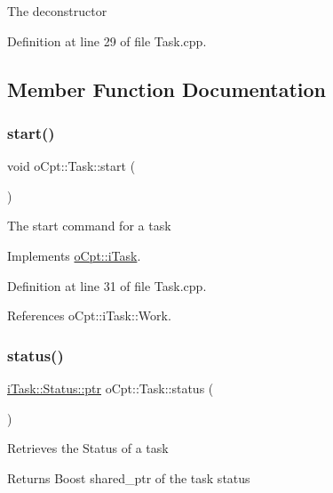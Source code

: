 The deconstructor 

Definition at line 29 of file Task.\+cpp.



\subsection{Member Function Documentation}
\hypertarget{classo_cpt_1_1_task_a8acd8d2125df0aef37eb1ebf0e3e49c8}{}\label{classo_cpt_1_1_task_a8acd8d2125df0aef37eb1ebf0e3e49c8} 
\subsubsection{\texorpdfstring{start()}{start()}}
{\footnotesize\ttfamily void o\+Cpt\+::\+Task\+::start (\begin{DoxyParamCaption}{ }\end{DoxyParamCaption})\hspace{0.3cm}{\ttfamily [virtual]}}

The start command for a task 

Implements \hyperlink{classo_cpt_1_1i_task_aedd48e3c4df48aaae0738ce3863e222f}{o\+Cpt\+::i\+Task}.



Definition at line 31 of file Task.\+cpp.



References o\+Cpt\+::i\+Task\+::\+Work.

\hypertarget{classo_cpt_1_1_task_a724445e158919a4b5644d8eef9f7c754}{}\label{classo_cpt_1_1_task_a724445e158919a4b5644d8eef9f7c754} 
\subsubsection{\texorpdfstring{status()}{status()}}
{\footnotesize\ttfamily \hyperlink{classo_cpt_1_1i_task_1_1_status_aaf766c58d038e2defc3de2dddb92d1eb}{i\+Task\+::\+Status\+::ptr} o\+Cpt\+::\+Task\+::status (\begin{DoxyParamCaption}{ }\end{DoxyParamCaption})\hspace{0.3cm}{\ttfamily [virtual]}}

Retrieves the Status of a task \begin{DoxyReturn}{Returns}
Boost shared\+\_\+ptr of the task status 
\end{DoxyReturn}


